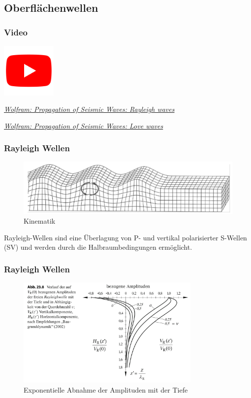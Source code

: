 \subsection{Oberflächenwellen}

\begin{frame}
\frametitle{Video}
\begin{center}
\includegraphics[width=0.2\textwidth]{fig_img/youtube.png}   
\end{center}

\href{https://www.youtube.com/watch?v=6yXgfYHAS7c}{\textsl{Wolfram: Propagation of Seismic Waves: Rayleigh waves}}

\href{https://www.youtube.com/watch?v=t7wJu0Kts7w}{\textsl{Wolfram: Propagation of Seismic Waves: Love waves}}

\end{frame}


\begin{frame}
\frametitle{Rayleigh Wellen}
\begin{figure}
\includegraphics[width=\textwidth]{fig_img/rayleigh_wave} 
\caption*{Kinematik \cite{Vrettos2017}}
\end{figure}

Rayleigh-Wellen sind eine Überlagung von P- und vertikal polarisierter S-Wellen (SV) und werden durch die Halbraumbedingungen ermöglicht.

\end{frame}


\begin{frame}
\frametitle{Rayleigh Wellen}

\begin{figure}
\includegraphics[width=0.8\textwidth]{fig_img/rayleigh_depth} 
\caption*{Exponentielle Abnahme der Amplituden mit der Tiefe \cite{Schmidt2017}}
\end{figure}
\end{frame}


